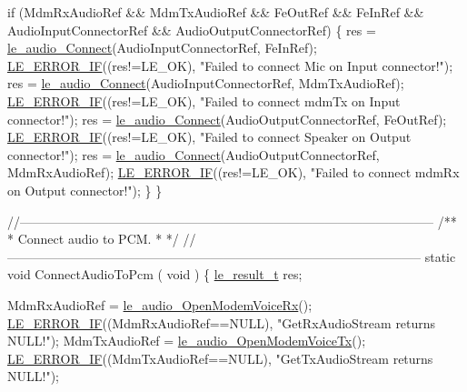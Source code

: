 \begin{DoxyCodeInclude}
{{{{{{{{{    \textcolor{keywordflow}{if} (MdmRxAudioRef && MdmTxAudioRef && FeOutRef && FeInRef &&
        AudioInputConnectorRef && AudioOutputConnectorRef)
    \{
        res = \hyperlink{le__audio__interface_8h_a338df65b2fb1ae0140d86880adbcf0de}{le\_audio\_Connect}(AudioInputConnectorRef, FeInRef);
        \hyperlink{le__log_8h_aceaf11a11691d6c676e36dd317b38dbd}{LE\_ERROR\_IF}((res!=LE\_OK), \textcolor{stringliteral}{"Failed to connect Mic on Input connector!"});
        res = \hyperlink{le__audio__interface_8h_a338df65b2fb1ae0140d86880adbcf0de}{le\_audio\_Connect}(AudioInputConnectorRef, MdmTxAudioRef);
        \hyperlink{le__log_8h_aceaf11a11691d6c676e36dd317b38dbd}{LE\_ERROR\_IF}((res!=LE\_OK), \textcolor{stringliteral}{"Failed to connect mdmTx on Input connector!"});
        res = \hyperlink{le__audio__interface_8h_a338df65b2fb1ae0140d86880adbcf0de}{le\_audio\_Connect}(AudioOutputConnectorRef, FeOutRef);
        \hyperlink{le__log_8h_aceaf11a11691d6c676e36dd317b38dbd}{LE\_ERROR\_IF}((res!=LE\_OK), \textcolor{stringliteral}{"Failed to connect Speaker on Output connector!"});
        res = \hyperlink{le__audio__interface_8h_a338df65b2fb1ae0140d86880adbcf0de}{le\_audio\_Connect}(AudioOutputConnectorRef, MdmRxAudioRef);
        \hyperlink{le__log_8h_aceaf11a11691d6c676e36dd317b38dbd}{LE\_ERROR\_IF}((res!=LE\_OK), \textcolor{stringliteral}{"Failed to connect mdmRx on Output connector!"});
    \}
\}

\textcolor{comment}{//--------------------------------------------------------------------------------------------------}\textcolor{comment}{}
\textcolor{comment}{/**}
\textcolor{comment}{ * Connect audio to PCM.}
\textcolor{comment}{ *}
\textcolor{comment}{ */}
\textcolor{comment}{//--------------------------------------------------------------------------------------------------}
\textcolor{keyword}{static} \textcolor{keywordtype}{void} ConnectAudioToPcm
(
    \textcolor{keywordtype}{void}
)
\{
    \hyperlink{le__basics_8h_a1cca095ed6ebab24b57a636382a6c86c}{le\_result\_t} res;

    MdmRxAudioRef = \hyperlink{le__audio__interface_8h_ae3ed568ba4d2763ea77e17e77b20ff02}{le\_audio\_OpenModemVoiceRx}();
    \hyperlink{le__log_8h_aceaf11a11691d6c676e36dd317b38dbd}{LE\_ERROR\_IF}((MdmRxAudioRef==NULL), \textcolor{stringliteral}{"GetRxAudioStream returns NULL!"});
    MdmTxAudioRef = \hyperlink{le__audio__interface_8h_ad745f008bb04873c817da7af3daf783d}{le\_audio\_OpenModemVoiceTx}();
    \hyperlink{le__log_8h_aceaf11a11691d6c676e36dd317b38dbd}{LE\_ERROR\_IF}((MdmTxAudioRef==NULL), \textcolor{stringliteral}{"GetTxAudioStream returns NULL!"});

}}}}}}}}}
\end{DoxyCodeInclude}
